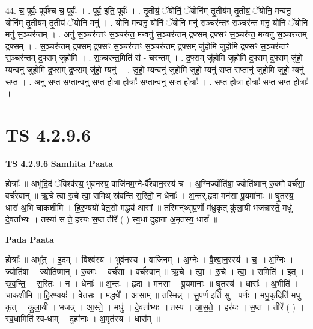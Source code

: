 \documentclass[17pt]{extarticle}
\begin{document}
44. च॒ पूर्वः॒ पूर्व॑श्च च॒ पूर्वः॑ । . पूर्व॒ इति॒ पूर्वः॑ । . तृ॒तीयं॒ ॅयोनिं॒ ॅयोनि॑म् तृ॒तीय॑म् तृ॒तीयं॒ ॅयोनि॒ मन्वनु॒ योनि॑म् तृ॒तीय॑म् तृ॒तीयं॒ ॅयोनि॒ मनु॑ । . योनि॒ मन्वनु॒ योनिं॒ ॅयोनि॒ मनु॑ स॒ञ्चर॑न्तꣳ स॒ञ्चर॑न्त॒ मनु॒ योनिं॒ ॅयोनि॒ मनु॑ स॒ञ्चर॑न्तम् । . अनु॑ स॒ञ्चर॑न्तꣳ स॒ञ्चर॑न्त॒ मन्वनु॑ स॒ञ्चर॑न्तम् द्र॒फ्सम् द्र॒फ्सꣳ स॒ञ्चर॑न्त॒ मन्वनु॑ स॒ञ्चर॑न्तम् द्र॒फ्सम् । . स॒ञ्चर॑न्तम् द्र॒फ्सम् द्र॒फ्सꣳ स॒ञ्चर॑न्तꣳ स॒ञ्चर॑न्तम् द्र॒फ्सम् जु॑होमि जुहोमि द्र॒फ्सꣳ स॒ञ्चर॑न्तꣳ स॒ञ्चर॑न्तम् द्र॒फ्सम् जु॑होमि । . स॒ञ्चर॑न्त॒मिति॑ सं - चर॑न्तम् । . द्र॒फ्सम् जु॑होमि जुहोमि द्र॒फ्सम् द्र॒फ्सम् जु॑हो॒ म्यन्वनु॑ जुहोमि द्र॒फ्सम् द्र॒फ्सम् जु॑हो॒ म्यनु॑ । . जु॒हो॒ म्यन्वनु॑ जुहोमि जुहो॒ म्यनु॑ स॒प्त स॒प्तानु॑ जुहोमि जुहो॒ म्यनु॑ स॒प्त । . अनु॑ स॒प्त स॒प्तान्वनु॑ स॒प्त होत्रा॒ होत्राः᳚ स॒प्तान्वनु॑ स॒प्त होत्राः᳚ । . स॒प्त होत्रा॒ होत्राः᳚ स॒प्त स॒प्त होत्राः᳚ । \newline
\pagebreak
{}

\section{ TS 4.2.9.6 }

\textbf{TS 4.2.9.6 } \newline
\textbf{Samhita Paata} \newline

होत्राः᳚ ॥ अभू॑दि॒दं ॅविश्व॑स्य॒ भुव॑नस्य॒ वाजि॑नम॒ग्ने-र्वै᳚श्वान॒रस्य॑ च । अ॒ग्निर्ज्योति॑षा॒ ज्योति॑ष्मान् रु॒क्मो वर्च॑सा॒ वर्च॑स्वान् ॥ ऋ॒चे त्वा॑ रु॒चे त्वा॒ समिथ् स्र॑वन्ति स॒रितो॒ न धेनाः᳚ । अ॒न्तर्.हृ॒दा मन॑सा पू॒यमा॑नाः ॥ घृ॒तस्य॒ धारा॑ अ॒भि चा॑कशीमि । हि॒र॒ण्ययो॑ वेत॒सो मद्ध्य॑ आसां ॥ तस्मिन्᳚थ्सुप॒र्णो म॑धु॒कृत् कु॑ला॒यी भज॑न्नास्ते॒ मधु॑ दे॒वता᳚भ्यः । तस्या॑ स ते॒ हर॑यः स॒प्त तीरे᳚ ( ) स्व॒धां दुहा॑ना अ॒मृत॑स्य॒ धारां᳚ ॥ \newline

\textbf{Pada Paata} \newline

होत्राः᳚ ॥ अभू᳚त् । इ॒दम् । विश्व॑स्य । भुव॑नस्य । वाजि॑नम् । अ॒ग्नेः । वै॒श्वा॒न॒रस्य॑ । च॒ ॥ अ॒ग्निः । ज्योति॑षा । ज्योति॑ष्मान् । रु॒क्मः । वर्च॑सा । वर्च॑स्वान् ॥ ऋ॒चे । त्वा॒ । रु॒चे । त्वा॒ । समिति॑ । इत् । स्र॒व॒न्ति॒ । स॒रितः॑ । न । धेनाः᳚ ॥ अ॒न्तः । हृ॒दा । मन॑सा । पू॒यमा॑नाः ॥ घृ॒तस्य॑ । धाराः᳚ । अ॒भीति॑ । चा॒क॒शी॒मि॒ ॥ हि॒र॒ण्ययः॑ । वे॒त॒सः । मद्ध्ये᳚ । आ॒सा॒म् ॥ तस्मिन्न्॑ । सु॒प॒र्ण इति॑ सु - प॒र्णः । म॒धु॒कृदिति॑ मधु - कृत् । कु॒ला॒यी । भजन्न्॑ । आ॒स्ते॒ । मधु॑ । दे॒वता᳚भ्यः ॥ तस्य॑ । आ॒स॒ते॒ । हर॑यः । स॒प्त । तीरे᳚ ( ) । स्व॒धामिति॑ स्व-धाम् । दुहा॑नाः । अ॒मृत॑स्य । धारा᳚म् ॥  \newline
\end{document}
